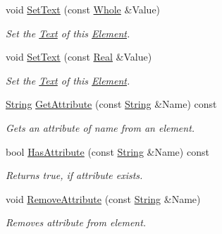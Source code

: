 \begin{DoxyCompactItemize}
void \hyperlink{classphys_1_1xml_1_1Element_a5935f39288aa474a8c1e050d9496542a}{SetText} (const \hyperlink{namespacephys_a460f6bc24c8dd347b05e0366ae34f34a}{Whole} \&Value)
\begin{DoxyCompactList}\small\item\em Set the \hyperlink{classphys_1_1xml_1_1Text}{Text} of this \hyperlink{classphys_1_1xml_1_1Element}{Element}. \item\end{DoxyCompactList}\item 
void \hyperlink{classphys_1_1xml_1_1Element_a6330848bbdeee061a175f57a7d358468}{SetText} (const \hyperlink{namespacephys_af7eb897198d265b8e868f45240230d5f}{Real} \&Value)
\begin{DoxyCompactList}\small\item\em Set the \hyperlink{classphys_1_1xml_1_1Text}{Text} of this \hyperlink{classphys_1_1xml_1_1Element}{Element}. \item\end{DoxyCompactList}\item 
\hyperlink{namespacephys_aa03900411993de7fbfec4789bc1d392e}{String} \hyperlink{classphys_1_1xml_1_1Element_aea8c51e9612092b6e4e8270b315a7b95}{GetAttribute} (const \hyperlink{namespacephys_aa03900411993de7fbfec4789bc1d392e}{String} \&Name) const 
\begin{DoxyCompactList}\small\item\em Gets an attribute of name from an element. \item\end{DoxyCompactList}\item 
bool \hyperlink{classphys_1_1xml_1_1Element_a63c2ea358cc9eba9735762195b6bc624}{HasAttribute} (const \hyperlink{namespacephys_aa03900411993de7fbfec4789bc1d392e}{String} \&Name) const 
\begin{DoxyCompactList}\small\item\em Returns true, if attribute exists. \item\end{DoxyCompactList}\item 
void \hyperlink{classphys_1_1xml_1_1Element_a552fd8fbde9a4974835efa5212123b4d}{RemoveAttribute} (const \hyperlink{namespacephys_aa03900411993de7fbfec4789bc1d392e}{String} \&Name)
\begin{DoxyCompactList}\small\item\em Removes attribute from element. \item\end{DoxyCompactList}\end{DoxyCompactItemize}
